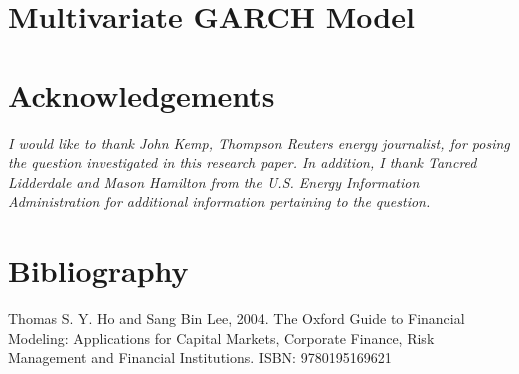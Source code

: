 \documentclass[11pt,]{article}
\begin{document}
\section{Multivariate GARCH Model}\label{multivariate-garch-model}

\section{Acknowledgements}\label{acknowledgements}

\emph{I would like to thank John Kemp, Thompson Reuters energy
journalist, for posing the question investigated in this research paper.
In addition, I thank Tancred Lidderdale and Mason Hamilton from the U.S.
Energy Information Administration for additional information pertaining
to the question.}

\section{Bibliography}\label{bibliography}

Thomas S. Y. Ho and Sang Bin Lee, 2004. The Oxford Guide to Financial
Modeling: Applications for Capital Markets, Corporate Finance, Risk
Management and Financial Institutions. ISBN: 9780195169621
\end{document}
